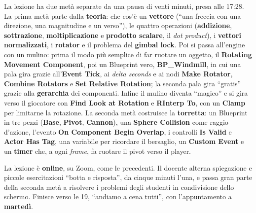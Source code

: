 La lezione ha due metà separate da una pausa di venti minuti, presa alle 17:28. La
prima metà parte dalla \textbf{teoria}: che cos'è un \textbf{vettore} (``una freccia
con una direzione, una magnitudine e un verso''), le quattro operazioni
(\textbf{addizione}, \textbf{sottrazione}, \textbf{moltiplicazione} e \textbf{prodotto
scalare}, il \emph{dot product}), i \textbf{vettori normalizzati}, i
\textbf{rotator} e il problema del \textbf{gimbal lock}. Poi si passa all'engine con un
mulino: prima il modo più semplice di far ruotare un oggetto, il \textbf{Rotating
Movement Component}, poi un Blueprint vero, \textbf{BP\_Windmill}, in cui una pala
gira grazie all'\textbf{Event Tick}, ai \emph{delta seconds} e ai nodi \textbf{Make
Rotator}, \textbf{Combine Rotators} e \textbf{Set Relative Rotation}; la seconda pala
gira ``gratis'' grazie alla \textbf{gerarchia} dei componenti. Infine il mulino
diventa ``magico'' e si gira verso il giocatore con \textbf{Find Look at Rotation} e
\textbf{RInterp To}, con un \textbf{Clamp} per limitarne la rotazione. La seconda metà
costruisce la \textbf{torretta}: un Blueprint in tre pezzi (\textbf{Base},
\textbf{Pivot}, \textbf{Cannon}), una \textbf{Sphere Collision} come raggio d'azione,
l'evento \textbf{On Component Begin Overlap}, i controlli \textbf{Is Valid} e
\textbf{Actor Has Tag}, una variabile per ricordare il bersaglio, un \textbf{Custom
Event} e un \textbf{timer} che, a ogni \emph{frame}, fa ruotare il pivot verso il
player.

La lezione è \textbf{online}, su Zoom, come le precedenti. Il docente alterna
spiegazione e piccole esercitazioni ``botta e risposta'', da cinque minuti l'una, e
passa gran parte della seconda metà a risolvere i problemi degli studenti in
condivisione dello schermo. Finisce verso le 19, ``andiamo a cena tutti'', con
l'appuntamento a \textbf{martedì}.

